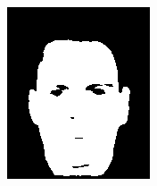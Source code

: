 \begin{figure}[h]
{\begin{subfigure}[b]{0.23\textwidth}
         \includegraphics[width=\textwidth]{images/results/cross/aa46_1.color.d3_ecu_sch_skinny283.png}
     \end{subfigure}
    \hfill
     \begin{subfigure}[b]{0.23\textwidth}
         \centering

\end{subfigure}}
\end{figure}
